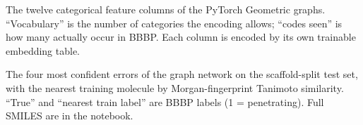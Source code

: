 \documentclass[11pt,a4paper]{article}
\begin{document}
\begin{table}[h]
\centering\footnotesize
\caption{The twelve categorical feature columns of the PyTorch Geometric graphs. ``Vocabulary'' is the
number of categories the encoding allows; ``codes seen'' is how many actually occur in BBBP. Each column
is encoded by its own trainable embedding table.}
\label{tab:features}

\end{table}

\begin{table}[h]
\centering\footnotesize
\caption{The four most confident errors of the graph network on the scaffold-split test set, with the
nearest training molecule by Morgan-fingerprint Tanimoto similarity. ``True'' and ``nearest train label''
are BBBP labels (1 = penetrating). Full SMILES are in the notebook.}
\label{tab:errors}

\end{table}

\vspace{1em}
\noindent
\end{document}
